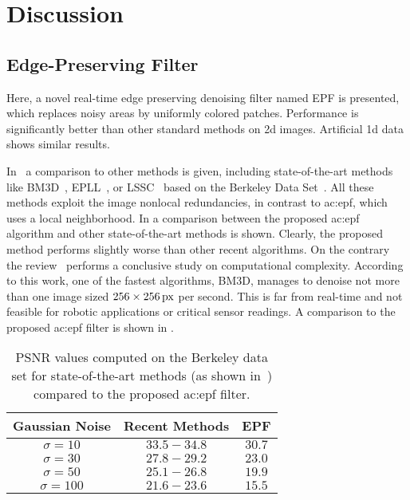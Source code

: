 \section{Discussion}
\label{sec:perception_discussion}





\subsection{Edge-Preserving Filter}

Here, a novel real-time edge preserving denoising filter named EPF is presented, which replaces noisy areas by uniformly colored patches. 
Performance is significantly better than other standard methods on 2d images. 
Artificial 1d data shows similar results.

In~\cite{gu2014weighted} a comparison to other methods is given, including state-of-the-art methods like BM3D~\cite{dabov2007image}, EPLL~\cite{zoran2011learning}, or LSSC~\cite{mairal2009non} based on the Berkeley Data Set~\cite{arbelaez2011contour}. 
All these methods exploit the image nonlocal redundancies, in contrast to \gls{ac:epf}, which uses a local neighborhood. 
In  a comparison between the proposed \gls{ac:epf} algorithm and other state-of-the-art methods is shown.
Clearly, the proposed method performs slightly worse than other recent algorithms.
On the contrary the review~\cite{shao2014heuristic} performs a conclusive study on computational complexity. 
According to this work, one of the fastest algorithms, BM3D, manages to denoise not more than one image sized $\unit[256 \times 256]{px}$ per second. 
This is far from real-time and not feasible for robotic applications or critical sensor readings. 
A comparison to the proposed \gls{ac:epf} filter is shown in .

\begin{table}[]
  \centering
  \begin{tabular}{ccc}
    \toprule
    Gaussian Noise  & Recent Methods & EPF\\
    \midrule
    $\sigma = 10$   & $33.5 - 34.8$ & $30.7$\\
    $\sigma = 30$   & $27.8 - 29.2$ & $23.0$\\
    $\sigma = 50$   & $25.1 - 26.8$ & $19.9$\\
    $\sigma = 100$  & $21.6 - 23.6$ & $15.5$\\
    \bottomrule
  \end{tabular}
  \caption{PSNR values computed on the Berkeley data set for state-of-the-art methods (as shown in~\cite{gu2014weighted}) compared to the proposed \gls{ac:epf} filter.}
  \label{tab:sensor_discussion_psnr}
\end{table}

